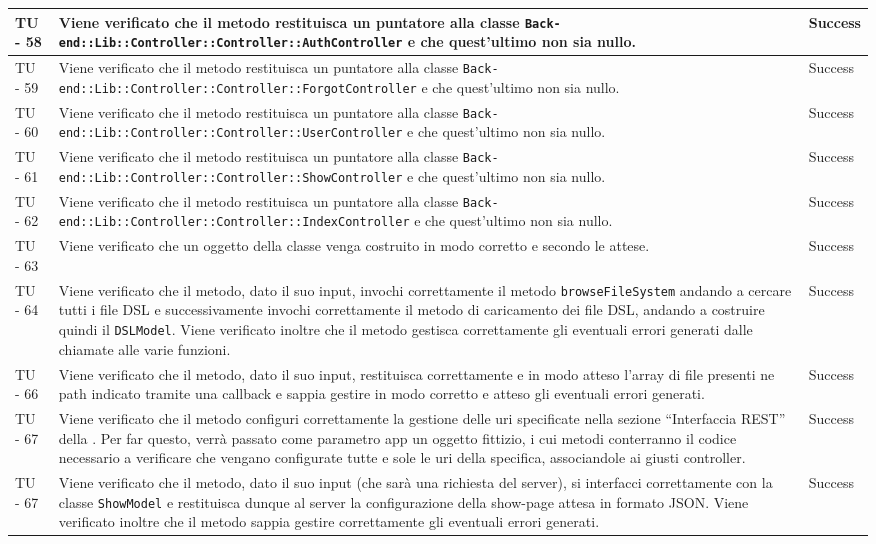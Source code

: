 \begin{center}
\begin{longtable}{ | p{3cm} | p{9cm} | p{2cm} | }
TU - 58 & Viene verificato che il metodo restituisca un puntatore alla classe \texttt{Back-end::Lib::Controller::Controller::AuthController} e che quest'ultimo non sia nullo. & Success \\ \hline
TU - 59 & Viene verificato che il metodo restituisca un puntatore alla classe \texttt{Back-end::Lib::Controller::Controller::ForgotController} e che quest'ultimo non sia nullo. & Success \\ \hline
TU - 60 & Viene verificato che il metodo restituisca un puntatore alla classe \texttt{Back-end::Lib::Controller::Controller::UserController} e che quest'ultimo non sia nullo. & Success \\ \hline
TU - 61 & Viene verificato che il metodo restituisca un puntatore alla classe \texttt{Back-end::Lib::Controller::Controller::ShowController} e che quest'ultimo non sia nullo. & Success \\ \hline
TU - 62 & Viene verificato che il metodo restituisca un puntatore alla classe \texttt{Back-end::Lib::Controller::Controller::IndexController} e che quest'ultimo non sia nullo. & Success \\ \hline
TU - 63 & Viene verificato che un oggetto della classe venga costruito in modo corretto e secondo le attese. & Success \\ \hline
TU - 64 & Viene verificato che il metodo, dato il suo input, invochi correttamente il metodo \texttt{browseFileSystem} andando a cercare tutti i file DSL e successivamente invochi correttamente il metodo di caricamento dei file DSL, andando a costruire quindi il \texttt{DSLModel}. Viene verificato inoltre che il metodo gestisca correttamente gli eventuali errori generati dalle chiamate alle varie funzioni. & Success \\ \hline
TU - 66 & Viene verificato che il metodo, dato il suo input, restituisca  correttamente e in modo atteso l'array di file presenti ne path indicato tramite una callback e sappia gestire in modo corretto e atteso gli eventuali errori generati. & Success \\ \hline
TU - 67 & Viene verificato che il metodo configuri correttamente la gestione delle uri specificate nella sezione ``Interfaccia REST'' della \SpecificaTecnica{}. Per far questo, verrà passato come parametro app un oggetto fittizio, i cui metodi conterranno il codice necessario a verificare che vengano configurate tutte e sole le uri della specifica, associandole ai giusti controller. & Success \\ \hline
TU - 67 & Viene verificato che il metodo, dato il suo input (che sarà una richiesta del server), si interfacci correttamente con la classe \texttt{ShowModel} e restituisca dunque al server la configurazione della show-page attesa in formato JSON. Viene verificato inoltre che il metodo sappia gestire correttamente gli eventuali errori generati.  & Success \\ \hline

\end{longtable}
\end{center}
